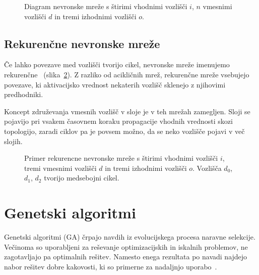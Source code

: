 \documentclass[a4paper,12pt,openright]{book}
\begin{document}
    \begin{figure}[H]
        \begin{center}
            
        \end{center}
        \caption{Diagram nevronske mreže s štirimi vhodnimi vozlišči $i$, $n$ vmesnimi vozlišči $d$ in tremi izhodnimi vozlišči $o$.}
        \label{fig:diagram-mreze}
    \end{figure}


    \subsection{Rekurenčne nevronske mreže}\label{subsec:rekurencne-nevronske-mreze}
    Če lahko povezave med vozlišči tvorijo cikel, nevronske mreže imenujemo rekurenčne~\cite{recurrent_neural_network_wiki} (slika~\ref{fig:diagram-rekurencne-mreze}).
    Z razliko od acikličnih mrež, rekurenčne mreže vsebujejo povezave, ki aktivacijsko vrednost nekaterih vozlišč
    sklenejo z njihovimi predhodniki.

    Koncept združevanja vmesnih vozlišč v sloje je v teh mrežah zamegljen.
    Sloji se pojavijo pri vsakem časovnem koraku propagacije vhodnih vrednosti skozi topologijo, zaradi ciklov pa je povsem možno,
    da se neko vozlišče pojavi v več slojih.
    \begin{figure}[H]
        \begin{center}
            
        \end{center}
        \caption{Primer rekurencne nevronske mreže s štirimi vhodnimi vozlišči $i$, tremi vmesnimi vozlišči $d$ in tremi izhodnimi vozlišči $o$.
        Vozlišča $d_0$, $d_1$, $d_2$ tvorijo medsebojni cikel.}
        \label{fig:diagram-rekurencne-mreze}
    \end{figure}

    \section{Genetski algoritmi}\label{sec:genetski-algoritmi}
    Genetski algoritmi (GA) črpajo navdih iz evolucijskega procesa naravne selekcije.
    Večinoma so uporabljeni za reševanje optimizacijskih in iskalnih problemov, ne zagotavljajo pa optimalnih rešitev.
    Namesto enega rezultata po navadi najdejo nabor rešitev dobre kakovosti, ki so primerne za nadaljnjo
    uporabo~\cite{inteligentni_sistemi_2010,genetic_algorithm_wiki_2022}.
\end{document}
